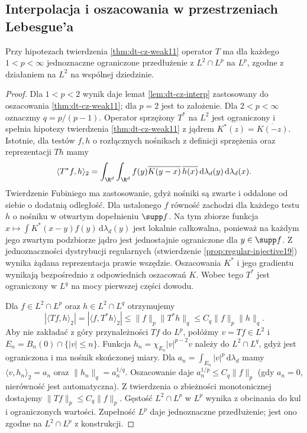 \subsection{Interpolacja i oszacowania w przestrzeniach Lebesgue'a}
\begin{twierdzenie}
\label{thm:dt-cz-general-lp}
Przy hipotezach twierdzenia \ref{thm:dt-cz-weak11}
operator $T$ ma dla każdego $1<p<\infty$ jednoznaczne
ograniczone przedłużenie z $L^2\cap L^p$ na $L^p$,
zgodne z działaniem na $L^2$ na wspólnej dziedzinie.
\end{twierdzenie}
\begin{proof}
Dla $1<p<2$ wynik daje lemat
\ref{lem:dt-cz-interp} zastosowany do oszacowania
\ref{thm:dt-cz-weak11}; dla $p=2$ jest to założenie.
Dla $2<p<\infty$ oznaczmy $q=p/(p-1)$.
Operator sprzężony $T^*$ na $L^2$ jest ograniczony
i spełnia hipotezy twierdzenia \ref{thm:dt-cz-weak11}
z jądrem $K^*(z)=\overline{K(-z)}$.
Istotnie, dla testów $f,h$ o rozłącznych nośnikach
z definicji sprzężenia oraz reprezentacji $Th$ mamy
\[
 \langle T^*f,h\rangle_2
 =\int_{\R^d}\int_{\R^d}f(y)
 \overline{K(y-x)}\,\overline{h(x)}
 \,\mathrm d\lambda_d(y)\,\mathrm d\lambda_d(x).
\]
Twierdzenie Fubiniego ma zastosowanie, gdyż nośniki
są zwarte i oddalone od siebie o dodatnią odległość.
Dla ustalonego $f$ równość zachodzi dla każdego testu
$h$ o nośniku w otwartym dopełnieniu $\supp f$.
Na tym zbiorze funkcja
$x\mapsto\int K^*(x-y)f(y)\,\mathrm d\lambda_d(y)$
jest lokalnie całkowalna, ponieważ na każdym jego
zwartym podzbiorze jądro jest jednostajnie ograniczone
dla $y\in\supp f$. Z jednoznaczności dystrybucji
regularnych (stwierdzenie \ref{prop:regular-injective19})
wynika żądana reprezentacja prawie wszędzie.
Oszacowania $K^*$ i jego gradientu wynikają
bezpośrednio z odpowiednich oszacowań $K$.
Wobec tego $T^*$ jest ograniczony w $L^q$
na mocy pierwszej części dowodu.

Dla $f\in L^2\cap L^p$ oraz $h\in L^2\cap L^q$
otrzymujemy
\[
 |\langle Tf,h\rangle_2|
 =|\langle f,T^*h\rangle_2|
 \le\|f\|_p\|T^*h\|_q
 \le C_q\|f\|_p\|h\|_q.
\]
Aby nie zakładać z góry przynależności $Tf$ do $L^p$,
połóżmy $v=Tf\in L^2$ i
$E_n=B_n(0)\cap\{|v|\le n\}$. Funkcja
$h_n=\chi_{E_n}|v|^{p-2}v$ należy do $L^2\cap L^q$,
gdyż jest ograniczona i ma nośnik skończonej miary.
Dla $a_n=\int_{E_n}|v|^p\,\mathrm d\lambda_d$ mamy
$\langle v,h_n\rangle_2=a_n$ oraz $\|h_n\|_q=a_n^{1/q}$.
Oszacowanie daje $a_n^{1/p}\le C_q\|f\|_p$
(gdy $a_n=0$, nierówność jest automatyczna).
Z twierdzenia o zbieżności monotonicznej dostajemy
$\|Tf\|_p\le C_q\|f\|_p$.
Gęstość $L^2\cap L^p$ w $L^p$ wynika z obcinania
do kul i ograniczonych wartości. Zupełność $L^p$
daje jednoznaczne przedłużenie; jest ono zgodne
na $L^2\cap L^p$ z konstrukcji.
\end{proof}

